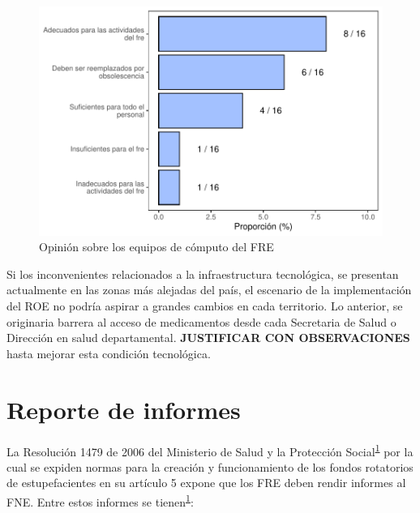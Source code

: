 \documentclass[
]{book}
\begin{document}
\begin{figure}
\includegraphics[width=0.85\linewidth]{InformeFinal_files/figure-latex/OpinionEquiposComputo-1} \caption{Opinión sobre los equipos de cómputo del FRE}\label{fig:OpinionEquiposComputo}
\end{figure}

Si los inconvenientes relacionados a la infraestructura tecnológica, se presentan actualmente en las zonas más alejadas del país, el escenario de la implementación del ROE no podría aspirar a grandes cambios en cada territorio. Lo anterior, se originaria barrera al acceso de medicamentos desde cada Secretaria de Salud o Dirección en salud departamental. \textbf{JUSTIFICAR CON OBSERVACIONES} hasta mejorar esta condición tecnológica.

\hypertarget{reporte-de-informes}{%
\chapter{Reporte de informes}\label{reporte-de-informes}}


La Resolución 1479 de 2006 del Ministerio de Salud y la Protección Social\textsuperscript{\protect\hyperlink{ref-MSPS1479-2006}{1}} por la cual se expiden normas para la creación y funcionamiento de los fondos rotatorios de estupefacientes en su artículo 5 expone que los FRE deben rendir informes al FNE. Entre estos informes se tienen\textsuperscript{\protect\hyperlink{ref-MSPS1479-2006}{1}}:
\end{document}
